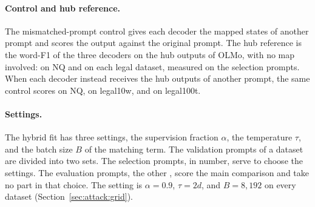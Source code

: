 \paragraph{Control and hub reference.} The mismatched-prompt control gives each decoder the mapped states of another prompt and scores the output against the original prompt.
The hub reference is the word-F1 of the three decoders on the hub outputs of OLMo, with no map involved:  on NQ and  on each legal dataset, measured on the  selection prompts.
When each decoder instead receives the hub outputs of another prompt, the same control scores  on NQ,  on legal10w, and  on legal100t.

\paragraph{Settings.} The hybrid fit has three settings, the supervision fraction $\alpha$, the temperature $\tau$, and the batch size $B$ of the matching term.
The  validation prompts of a dataset are divided into two sets.
The selection prompts,  in number, serve to choose the settings.
The evaluation prompts, the other , score the main comparison and take no part in that choice.
The setting is $\alpha = 0.9$, $\tau = 2d$, and $B = 8{,}192$ on every dataset (Section~\ref{sec:attack:grid}).

